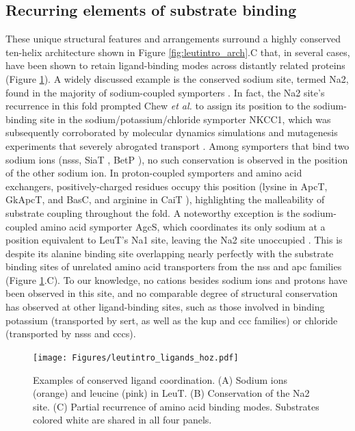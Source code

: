 \subsection{Recurring elements of substrate binding}\label{sec:ligands}

These unique structural features and arrangements surround a highly conserved ten-helix architecture shown in Figure \ref{fig:leutintro_arch}.C that, in several cases, have been shown to retain ligand-binding modes across distantly related proteins (Figure \ref{fig:leutintro_ligands}). A widely discussed example is the conserved sodium site, termed Na2, found in the majority of sodium-coupled symporters \citep*{Faham2008, Ressl2009, Wahlgren2018, Weyand2008, Yamashita2005}. In fact, the Na2 site's recurrence in this fold prompted Chew \emph{et al.} to assign its position to the sodium-binding site in the sodium/potassium/chloride symporter NKCC1, which was subsequently corroborated by molecular dynamics simulations and mutagenesis experiments that severely abrogated transport \citep*{Chew2019, Janos2021}. Among symporters that bind two sodium ions (\gls{nss}s, SiaT \citep*{Wahlgren2018}, BetP \citep*{Khafizov2012}), no such conservation is observed in the position of the other sodium ion. In proton-coupled symporters and amino acid exchangers, positively-charged residues occupy this position (lysine in ApcT, GkApcT, and BasC, and arginine in CaiT \citep*{Errasti-Murugarren2019, Gao2009, Jungnickel2018, Schulze2010, Tang2010}), highlighting the malleability of substrate coupling throughout the fold. A noteworthy exception is the sodium-coupled amino acid symporter AgcS, which coordinates its only sodium at a position equivalent to LeuT's Na1 site, leaving the Na2 site unoccupied \citep*{Ma2018}. This is despite its alanine binding site overlapping nearly perfectly with the substrate binding sites of unrelated amino acid transporters from the \gls{nss} and \gls{apc} families (Figure \ref{fig:leutintro_ligands}.C). To our knowledge, no cations besides sodium ions and protons have been observed in this site, and no comparable degree of structural conservation has observed at other ligand-binding sites, such as those involved in binding potassium (transported by \gls{sert}, as well as the \gls{kup} and \gls{ccc} families) or chloride (transported by \gls{nss}s and \gls{ccc}s).


\begin{figure}[h]
\centering
\texttt{[image: Figures/leutintro\_ligands\_hoz.pdf]}
 \caption[Examples of conserved ligand coordination.]{Examples of conserved ligand coordination. (A) Sodium ions (orange) and leucine (pink) in LeuT. (B) Conservation of the Na2 site. (C) Partial recurrence of amino acid binding modes. Substrates colored white are shared in all four panels.}
\label{fig:leutintro_ligands}
\end{figure}


